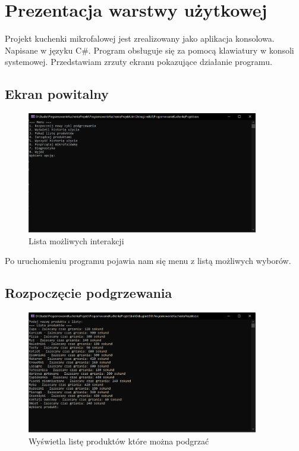 \chapter{Prezentacja warstwy użytkowej}
Projekt kuchenki mikrofalowej jest zrealizowany jako aplikacja konsolowa. Napisane w języku C\#. Program obsługuje się za pomocą klawiatury w konsoli systemowej. 
Przedstawiam zrzuty ekranu pokazujące działanie programu.

\section{Ekran powitalny}

\begin{figure}[h]
    \centering
    \includegraphics[width=0.9\textwidth]{EkranPowitalny.png}
      \caption{Lista możliwych interakcji}
    \label{fig:example}
\end{figure}

Po uruchomieniu programu pojawia nam się menu z listą możliwych wyborów.

\newpage

\section{Rozpoczęcie podgrzewania}

\begin{figure}[h]
    \centering
    \includegraphics[width=0.9\textwidth]{Menu1.png}
      \caption{Wyświetla listę produktów które można podgrzać}
    \label{fig:example}
\end{figure}

